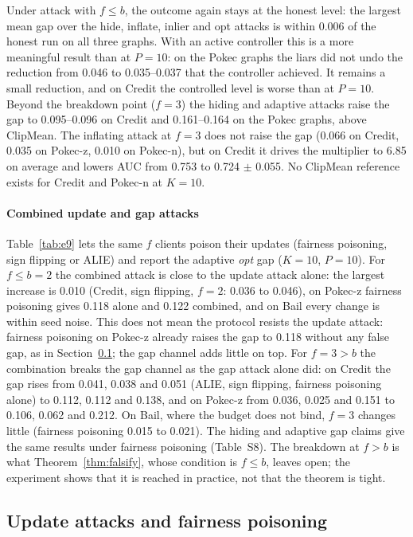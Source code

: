 Under attack with $f\le b$, the outcome again stays at the honest level: the largest mean gap over the hide, inflate, inlier and opt attacks is within 0.006 of the honest run on all three graphs. With an active controller this is a more meaningful result than at $P=10$: on the Pokec graphs the liars did not undo the reduction from 0.046 to 0.035--0.037 that the controller achieved. It remains a small reduction, and on Credit the controlled level is worse than at $P=10$. Beyond the breakdown point ($f=3$) the hiding and adaptive attacks raise the gap to 0.095--0.096 on Credit and 0.161--0.164 on the Pokec graphs, above ClipMean. The inflating attack at $f=3$ does not raise the gap (0.066 on Credit, 0.035 on Pokec-z, 0.010 on Pokec-n), but on Credit it drives the multiplier to 6.85 on average and lowers AUC from 0.753 to 0.724 $\pm$ 0.055. No ClipMean reference exists for Credit and Pokec-n at $K=10$.



\paragraph{Combined update and gap attacks}
Table~\ref{tab:e9} lets the same $f$ clients poison their updates (fairness poisoning, sign flipping or ALIE) and report the adaptive \emph{opt} gap ($K=10$, $P=10$). For $f\le b=2$ the combined attack is close to the update attack alone: the largest increase is 0.010 (Credit, sign flipping, $f=2$: 0.036 to 0.046), on Pokec-z fairness poisoning gives 0.118 alone and 0.122 combined, and on Bail every change is within seed noise. This does not mean the protocol resists the update attack: fairness poisoning on Pokec-z already raises the gap to 0.118 without any false gap, as in Section~\ref{sec:byz}; the gap channel adds little on top. For $f=3>b$ the combination breaks the gap channel as the gap attack alone did: on Credit the gap rises from 0.041, 0.038 and 0.051 (ALIE, sign flipping, fairness poisoning alone) to 0.112, 0.112 and 0.138, and on Pokec-z from 0.036, 0.025 and 0.151 to 0.106, 0.062 and 0.212. On Bail, where the budget does not bind, $f=3$ changes little (fairness poisoning 0.015 to 0.021). The hiding and adaptive gap claims give the same results under fairness poisoning (Table~S8). The breakdown at $f>b$ is what Theorem~\ref{thm:falsify}, whose condition is $f\le b$, leaves open; the experiment shows that it is reached in practice, not that the theorem is tight.

\subsection{Update attacks and fairness poisoning}\label{sec:byz}


